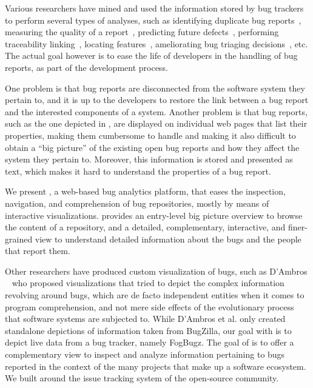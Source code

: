 Various researchers have mined and used the information stored by bug trackers to perform several types of analyses, such as identifying duplicate bug reports~\cite{Wang2008a}, measuring the quality of a report~\cite{Zimm2010a}, predicting future defects~\cite{DAmb2012a}, performing traceability linking~\cite{Biss2013a}, locating features~\cite{Dit2013a}, ameliorating bug triaging decisions~\cite{Anvi2006a}, etc.
The actual goal however is to ease the life of developers in the handling of bug reports, as part of the development process.

One problem is that bug reports are disconnected from the software system they pertain to, and it is up to the developers to restore the link between a bug report and the interested components of a system.
Another problem is that bug reports, such as the one depicted in , are displayed on individual web pages that list their properties, making them cumbersome to handle and making it also difficult to obtain a ``big picture'' of the existing open bug reports and how they affect the system they pertain to.
Moreover, this information is stored and presented as text, which makes it hard to understand the properties of a bug report.

We present \ib, a web-based bug analytics platform, that eases the inspection, navigation, and comprehension of bug repositories, mostly by means of interactive visualizations.
\ib provides an entry-level big picture overview to browse the content of a repository, and a detailed, complementary, interactive, and finer-grained view to understand detailed information about the bugs and the people that report them.

Other researchers have produced custom visualization of bugs, such as D'Ambros \etal~\cite{DAmb2007a,DAmb2007b} who proposed visualizations that tried to depict the complex information revolving around bugs, which are de facto independent entities when it comes to program comprehension, and not mere side effects of the evolutionary process that software systems are subjected to.
While D'Ambros et al. only created standalone depictions of information taken from BugZilla, our goal with \ib is to depict live data from a bug tracker, namely FogBugz.
The goal of \ib is to offer a complementary view to inspect and analyze information pertaining to bugs reported in the context of the many projects that make up a software ecosystem.
We built \ib around the issue tracking system of the \pha open-source community.

